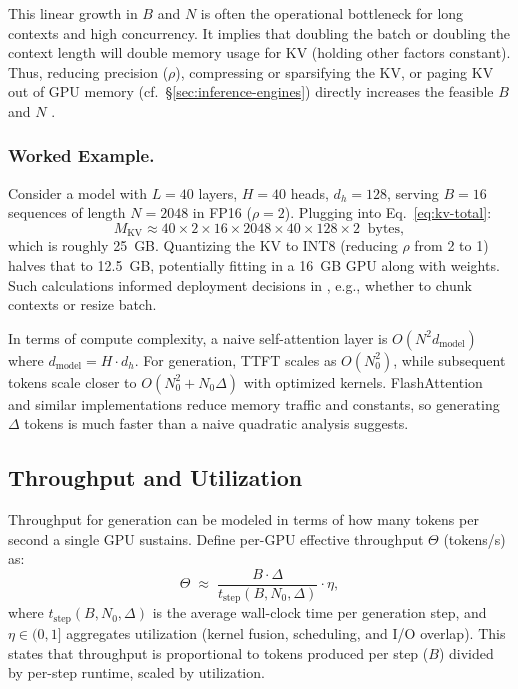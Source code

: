 This linear growth in $B$ and $N$ is often the operational bottleneck for long contexts and high concurrency. It implies that doubling the batch or doubling the context length will double memory usage for KV (holding other factors constant). Thus, reducing precision ($\rho$), compressing or sparsifying the KV, or paging KV out of GPU memory (cf.~\S\ref{sec:inference-engines}) directly increases the feasible $B$ and $N$ \cite{Kwon2023vLLM}.

\subsubsection{Worked Example.}  
Consider a model with $L=40$ layers, $H=40$ heads, $d_h=128$, serving $B=16$ sequences of length $N=2048$ in FP16 ($\rho=2$). Plugging into Eq.~\eqref{eq:kv-total}:
\[
M_{\text{KV}} \approx 40 \times 2 \times 16 \times 2048 \times 40 \times 128 \times 2 \;\; \text{bytes},
\]
which is roughly 25~GB. Quantizing the KV to INT8 (reducing $\rho$ from 2 to 1) halves that to 12.5~GB, potentially fitting in a 16~GB GPU along with weights. Such calculations informed deployment decisions in \ishtar{}, e.g., whether to chunk contexts or resize batch.

In terms of compute complexity, a naive self-attention layer is $O(N^2 d_{\text{model}})$ where $d_{\text{model}} = H \cdot d_h$. For generation, TTFT scales as $O(N_0^2)$, while subsequent tokens scale closer to $O(N_0^2 + N_0 \Delta)$ with optimized kernels. FlashAttention~\cite{Dao2022FlashAttention} and similar implementations reduce memory traffic and constants, so generating $\Delta$ tokens is much faster than a naive quadratic analysis suggests.

\subsection{Throughput and Utilization}
Throughput for generation can be modeled in terms of how many tokens per second a single GPU sustains. Define per-GPU effective throughput $\Theta$ (tokens/s) as:
\begin{equation}
\Theta \;\approx\; \frac{B \cdot \Delta}{t_{\text{step}}(B, N_0, \Delta)} \cdot \eta,
\label{eq:throughput-main}
\end{equation}
where $t_{\text{step}}(B, N_0, \Delta)$ is the average wall-clock time per generation step, and $\eta \in (0,1]$ aggregates utilization (kernel fusion, scheduling, and I/O overlap). This states that throughput is proportional to tokens produced per step ($B$) divided by per-step runtime, scaled by utilization.

